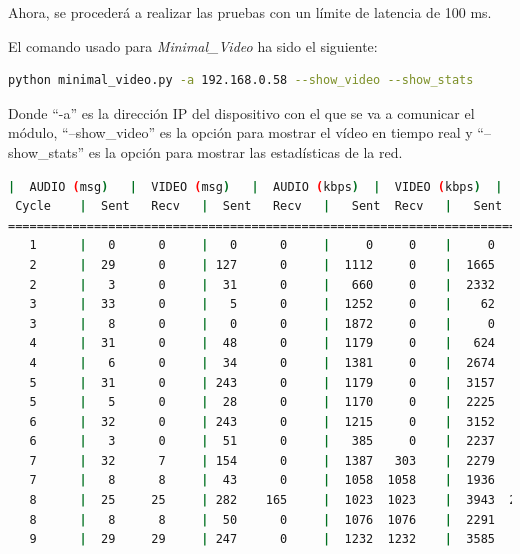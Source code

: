 Ahora, se procederá a realizar las pruebas con un límite de latencia de 100 ms. 
\vspace{\baselineskip}

El comando usado para \textit{Minimal\_Video} ha sido el siguiente:
\begin{lstlisting}[language=bash]
python minimal_video.py -a 192.168.0.58 --show_video --show_stats
\end{lstlisting}
Donde ``-a'' es la dirección IP del dispositivo con el que se va a comunicar el módulo, ``--show\_video'' es la opción para mostrar el vídeo en tiempo real y ``--show\_stats'' es la opción para mostrar las estadísticas de la red.
\vspace{\baselineskip}

\begin{lstlisting}[language=bash,basicstyle=\ttfamily\scriptsize]
          |  AUDIO (msg)   |  VIDEO (msg)   |  AUDIO (kbps)  |  VIDEO (kbps)  |   CPU (%)
 Cycle    |  Sent   Recv   |  Sent   Recv   |   Sent  Recv   |   Sent  Recv   | Program System
============================================================================================
   1      |   0      0     |   0      0     |     0     0    |     0     0    |   0      0
   2      |  29      0     | 127      0     |  1112     0    |  1665     0    |  28     60
   2      |   3      0     |  31      0     |   660     0    |  2332     0    |  53     61
   3      |  33      0     |   5      0     |  1252     0    |    62     0    |  33     75
   3      |   8      0     |   0      0     |  1872     0    |     0     0    |  50     76
   4      |  31      0     |  48      0     |  1179     0    |   624     0    |  31     72
   4      |   6      0     |  34      0     |  1381     0    |  2674     0    |  28     71
   5      |  31      0     | 243      0     |  1179     0    |  3157     0    |  47     65
   5      |   5      0     |  28      0     |  1170     0    |  2225     0    |  42     66
   6      |  32      0     | 243      0     |  1215     0    |  3152     0    |  41     70
   6      |   3      0     |  51      0     |   385     0    |  2237     0    |  39     70
   7      |  32      7     | 154      0     |  1387   303    |  2279     0    |  26     73
   7      |   8      8     |  43      0     |  1058  1058    |  1936     0    |  12     72
   8      |  25     25     | 282    165     |  1023  1023    |  3943  2306    |  32     69
   8      |   8      8     |  50      0     |  1076  1076    |  2291     0    |  41     69
   9      |  29     29     | 247      0     |  1232  1232    |  3585     0    |  55     71

\end{lstlisting}
